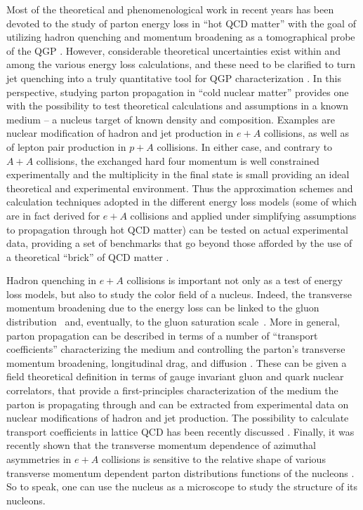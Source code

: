 Most of the theoretical and phenomenological work in recent years has been devoted to the study of parton energy loss in ``hot QCD matter'' with the goal of utilizing hadron quenching and momentum broadening as a tomographical probe of the QGP \cite{Majumder:2010qh}. However, considerable theoretical uncertainties exist within and among the various energy loss calculations, and these need to be clarified to turn jet quenching into a truly quantitative tool for QGP characterization \cite{Armesto:2011ht}. In this perspective, studying parton propagation in ``cold nuclear matter'' \cite{Accardi:2009qv} provides one with the possibility to test theoretical calculations and assumptions in a known medium -- a nucleus target of known density and composition. Examples are nuclear modification of hadron and jet production in $e+A$ collisions, as well as of lepton pair production in $p+A$ collisions. In either case, and contrary to $A+A$ collisions, the exchanged hard four momentum is well constrained experimentally and the multiplicity in the final state is small providing an ideal theoretical and experimental environment. Thus the approximation schemes and calculation techniques adopted in the different energy loss models (some of which are in fact derived for $e+A$ collisions and applied under simplifying assumptions to propagation through hot QCD matter) can be tested on actual experimental data, providing a set of benchmarks that go beyond those afforded by the use of a theoretical ``brick'' of QCD matter \cite{Armesto:2011ht}. 

Hadron quenching in $e+A$ collisions is important not only as a test of energy loss models, but also to study the color field of a nucleus. Indeed, the transverse momentum broadening due to the energy loss can be linked 
to the gluon distribution~\cite{Baier:1996sk} and, eventually, to the gluon 
saturation scale~\cite{Kopeliovich:2010aa}. More in general, parton propagation
can be described in terms of a number of ``transport coefficients'' characterizing the medium and controlling the parton's transverse momentum broadening, longitudinal drag, and diffusion \cite{Majumder:2008zg,Majumder:2007hx,Idilbi:2008vm,other-transport-coefficients?}. These can be given a field theoretical definition in terms of gauge invariant gluon and quark nuclear correlators, that provide a first-principles characterization of the medium the parton is propagating through and can be  extracted from experimental data on nuclear modifications of hadron and jet production. The possibility to calculate transport coefficients in lattice QCD has been recently discussed \cite{Majumder:2012sh}. Finally, it was recently shown that the transverse momentum dependence of azimuthal asymmetries in $e+A$ collisions is sensitive to the relative shape of various transverse momentum dependent parton distributions functions of the nucleons \cite{Gao:2010mj,Song:2010pf,Song:2013sja}. So to speak, one can use the nucleus as a microscope to study the structure of its nucleons.


